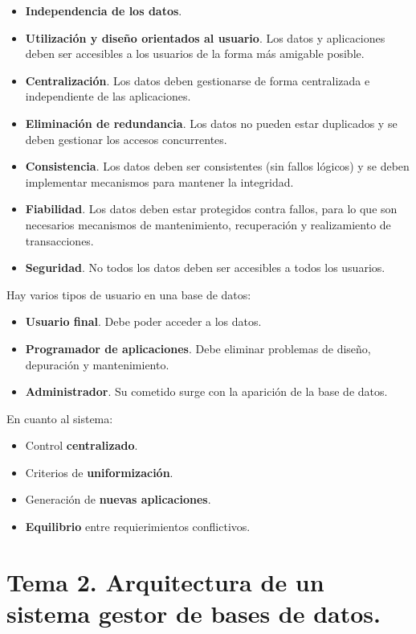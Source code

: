 \documentclass[12pt,spanish]{article}
\begin{document}
\begin{itemize}
	\item \textbf{Independencia de los datos}.
	\item \textbf{Utilización y diseño orientados al usuario}. Los datos y aplicaciones deben ser accesibles a los usuarios de la forma más amigable posible.
	\item \textbf{Centralización}. Los datos deben gestionarse de forma centralizada e independiente de las aplicaciones.
	\item \textbf{Eliminación de redundancia}. Los datos no pueden estar duplicados y se deben gestionar los accesos concurrentes.
	\item \textbf{Consistencia}. Los datos deben ser consistentes (sin fallos lógicos) y se deben implementar mecanismos para mantener la integridad.
	\item \textbf{Fiabilidad}. Los datos deben estar protegidos contra fallos, para lo que son necesarios mecanismos de mantenimiento, recuperación y realizamiento de transacciones.
	\item \textbf{Seguridad}. No todos los datos deben ser accesibles a todos los usuarios.
\end{itemize}

Hay varios tipos de usuario en una base de datos:

\begin{itemize}
	\item \textbf{Usuario final}. Debe poder acceder a los datos.
	\item \textbf{Programador de aplicaciones}. Debe eliminar problemas de diseño, depuración y mantenimiento.
	\item \textbf{Administrador}. Su cometido surge con la aparición de la base de datos.
\end{itemize}

En cuanto al sistema:

\begin{itemize}
	\item Control \textbf{centralizado}.
	\item Criterios de \textbf{uniformización}.
	\item Generación de \textbf{nuevas aplicaciones}.
	\item \textbf{Equilibrio} entre requierimientos conflictivos.
\end{itemize}

\section{Tema 2. Arquitectura de un sistema gestor de bases de datos.}
\end{document}
